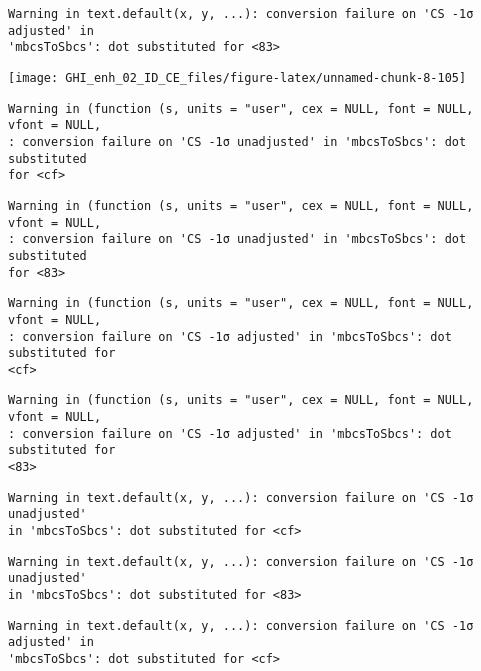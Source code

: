 \documentclass[
  10pt,
  a4paper,oneside]{article}
\begin{document}
\begin{verbatim}
Warning in text.default(x, y, ...): conversion failure on 'CS -1σ adjusted' in
'mbcsToSbcs': dot substituted for <83>
\end{verbatim}

\begin{center}\texttt{[image: GHI\_enh\_02\_ID\_CE\_files/figure-latex/unnamed-chunk-8-105]} \end{center}

\begin{verbatim}
Warning in (function (s, units = "user", cex = NULL, font = NULL, vfont = NULL,
: conversion failure on 'CS -1σ unadjusted' in 'mbcsToSbcs': dot substituted
for <cf>
\end{verbatim}

\begin{verbatim}
Warning in (function (s, units = "user", cex = NULL, font = NULL, vfont = NULL,
: conversion failure on 'CS -1σ unadjusted' in 'mbcsToSbcs': dot substituted
for <83>
\end{verbatim}

\begin{verbatim}
Warning in (function (s, units = "user", cex = NULL, font = NULL, vfont = NULL,
: conversion failure on 'CS -1σ adjusted' in 'mbcsToSbcs': dot substituted for
<cf>
\end{verbatim}

\begin{verbatim}
Warning in (function (s, units = "user", cex = NULL, font = NULL, vfont = NULL,
: conversion failure on 'CS -1σ adjusted' in 'mbcsToSbcs': dot substituted for
<83>
\end{verbatim}

\begin{verbatim}
Warning in text.default(x, y, ...): conversion failure on 'CS -1σ unadjusted'
in 'mbcsToSbcs': dot substituted for <cf>
\end{verbatim}

\begin{verbatim}
Warning in text.default(x, y, ...): conversion failure on 'CS -1σ unadjusted'
in 'mbcsToSbcs': dot substituted for <83>
\end{verbatim}

\begin{verbatim}
Warning in text.default(x, y, ...): conversion failure on 'CS -1σ adjusted' in
'mbcsToSbcs': dot substituted for <cf>
\end{verbatim}
\end{document}
